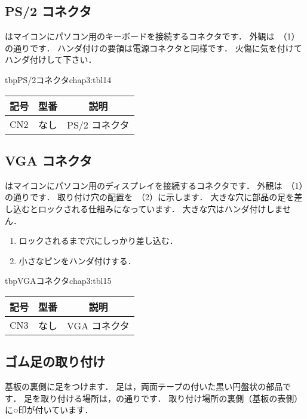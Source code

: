 \subsection{PS/2 コネクタ}
はマイコンにパソコン用のキーボードを接続するコネクタです．
外観は~（1）の通りです．
ハンダ付けの要領は電源コネクタと同様です．
火傷に気を付けてハンダ付けして下さい．

\begin{mytable}{tbp}{PS/2コネクタ}{chap3:tbl14}
{\small\begin{tabular}{l|l|l}
\hline
\hline
\multicolumn{1}{c|}{記号} &
\multicolumn{1}{c|}{型番} &
\multicolumn{1}{c}{説明} \\
\hline
CN2 & なし & PS/2 コネクタ \\
\end{tabular}}
\end{mytable}


\subsection{VGA コネクタ}
はマイコンにパソコン用のディスプレイを接続するコネクタです．
外観は~（1）の通りです．
取り付け穴の配置を~（2）に示します．
大きな穴に部品の足を差し込むとロックされる仕組みになっています．
大きな穴はハンダ付けしません．

\begin{enumerate}
\item ロックされるまで穴にしっかり差し込む．
\item 小さなピンをハンダ付けする．
\end{enumerate}

\begin{mytable}{tbp}{VGAコネクタ}{chap3:tbl15}
{\small\begin{tabular}{l|l|l}
\hline
\hline
\multicolumn{1}{c|}{記号} &
\multicolumn{1}{c|}{型番} &
\multicolumn{1}{c}{説明} \\
\hline
CN3 & なし & VGA コネクタ \\
\end{tabular}}
\end{mytable}


\subsection{ゴム足の取り付け}
基板の裏側に足をつけます．
足は，両面テープの付いた黒い円盤状の部品です．
足を取り付ける場所は，の通りです．
取り付け場所の裏側（基板の表側）に○印が付いています．

